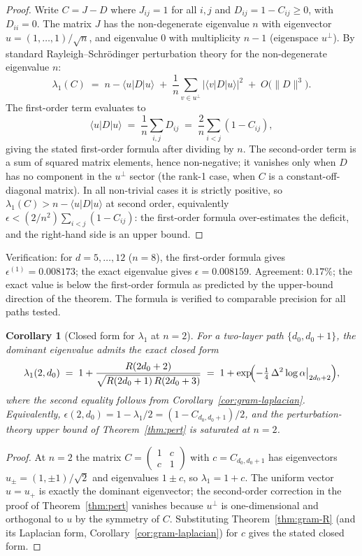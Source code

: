 \documentclass[12pt,a4paper]{article}
\newtheorem{corollary}[theorem]{Corollary}
\theoremstyle{remark}
\begin{document}
\begin{proof}
Write $C = J - D$ where $J_{ij} = 1$ for all $i,j$ and $D_{ij} = 1 - C_{ij} \geq 0$, with $D_{ii} = 0$. The matrix $J$ has the non-degenerate eigenvalue $n$ with eigenvector $u = (1, \ldots, 1)/\sqrt{n}$, and eigenvalue $0$ with multiplicity $n - 1$ (eigenspace $u^\perp$). By standard Rayleigh--Schr\"odinger perturbation theory for the non-degenerate eigenvalue $n$:
\[
\lambda_1(C) \;=\; n - \langle u | D | u \rangle \;+\; \frac{1}{n}\sum_{v \in u^\perp}|\langle v | D | u \rangle|^2 \;+\; O\!\bigl(\|D\|^3\bigr).
\]
The first-order term evaluates to
\[
\langle u | D | u \rangle \;=\; \frac{1}{n}\sum_{i,j}D_{ij} \;=\; \frac{2}{n}\sum_{i<j}(1 - C_{ij}),
\]
giving the stated first-order formula after dividing by $n$. The second-order term is a sum of squared matrix elements, hence non-negative; it vanishes only when $D$ has no component in the $u^\perp$ sector (the rank-1 case, when $C$ is a constant-off-diagonal matrix). In all non-trivial cases it is strictly positive, so $\lambda_1(C) > n - \langle u|D|u\rangle$ at second order, equivalently $\epsilon < (2/n^2)\sum_{i<j}(1 - C_{ij})$: the first-order formula over-estimates the deficit, and the right-hand side is an upper bound.
\end{proof}

\noindent Verification: for $d = 5, \ldots, 12$ ($n = 8$), the first-order formula gives $\epsilon^{(1)} = 0.008173$; the exact eigenvalue gives $\epsilon = 0.008159$. Agreement: $0.17\%$; the exact value is below the first-order formula as predicted by the upper-bound direction of the theorem. The formula is verified to comparable precision for all paths tested.

\begin{corollary}[Closed form for $\lambda_1$ at $n = 2$]\label{cor:lambda1-n2}
For a two-layer path $\{d_0, d_0 + 1\}$, the dominant eigenvalue admits the exact closed form
\[
\lambda_1(2, d_0) \;=\; 1 + \frac{R(2 d_0 + 2)}{\sqrt{R(2 d_0 + 1)\,R(2 d_0 + 3)}}
\;=\; 1 + \exp\!\Bigl(-\tfrac{1}{4}\,\Delta^2 \log\alpha\big|_{2d_0+2}\Bigr),
\]
where the second equality follows from Corollary~\ref{cor:gram-laplacian}. Equivalently, $\epsilon(2, d_0) = 1 - \lambda_1/2 = (1 - C_{d_0, d_0+1})/2$, and the perturbation-theory upper bound of Theorem~\ref{thm:pert} is saturated at $n = 2$.
\end{corollary}

\begin{proof}
At $n = 2$ the matrix $C = \begin{pmatrix}1 & c \\ c & 1\end{pmatrix}$ with $c = C_{d_0, d_0 + 1}$ has eigenvectors $u_\pm = (1, \pm 1)/\sqrt{2}$ and eigenvalues $1 \pm c$, so $\lambda_1 = 1 + c$. The uniform vector $u = u_+$ is exactly the dominant eigenvector; the second-order correction in the proof of Theorem~\ref{thm:pert} vanishes because $u^\perp$ is one-dimensional and orthogonal to $u$ by the symmetry of $C$. Substituting Theorem~\ref{thm:gram-R} (and its Laplacian form, Corollary~\ref{cor:gram-laplacian}) for $c$ gives the stated closed form.
\end{proof}
\end{document}
